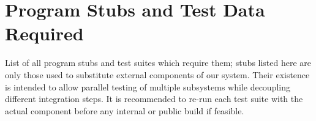 \section{Program Stubs and Test Data Required}

List of all program stubs and test suites which require them; stubs listed here are only those used to substitute external components of our system. Their existence is intended to allow parallel testing of multiple subsystems while decoupling different integration steps. It is recommended to re-run each test suite with the actual component before any internal or public build if feasible.\\

